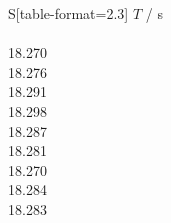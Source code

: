 \begin{table}[!htp]
\centering
\caption{Periodendauern ohne Magnetfeld.}
\label{tab:periodendauer}
\begin{tabular}{S[table-format=2.3]}
\toprule
{$T$ / s} \\
 \\
18.270 \\
18.276 \\
18.291 \\
18.298 \\
18.287 \\
18.281 \\
18.270 \\
18.284 \\
18.283 \\
\bottomrule
\end{tabular}
\end{table}